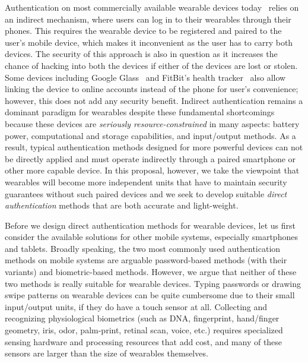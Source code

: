 Authentication on most commercially available wearable devices today~\cite{fitbit, smartwatch} relies on an indirect mechanism, where users can log in to their wearables through their phones. This requires the wearable device to be registered and paired to the user's mobile device, which makes it inconvenient as the user has to carry both devices. The security of this approach is also in question as it increases the chance of hacking into both the devices if either of the devices are lost or stolen. Some devices including Google Glass~\cite{googleglass} and FitBit's health tracker~\cite{fitbit} also allow linking the device to online accounts instead of the phone for user's convenience; however, this does not add any security benefit. Indirect authentication remains a dominant paradigm for wearables despite these fundamental shortcomings because these devices are \emph{seriously resource-constrained} in many aspects: battery power, computational and storage capabilities, and input/output methods. As a result, typical authentication methods designed for more powerful devices can not be directly applied and must operate indirectly through a paired smartphone or other more capable device. In this proposal, however, we take the viewpoint that wearables will become more independent units that have to maintain security guarantees without such paired devices and we seek to develop suitable \emph{direct authentication} methods that are both accurate and light-weight.

Before we design direct authentication methods for wearable devices, let us first consider the available solutions for other mobile systems, especially smartphones and tablets. Broadly speaking, the two most commonly used authentication methods on mobile systems are arguable password-based methods (with their variants) and biometric-based methods. However, we argue that neither of these two methods is really suitable for wearable devices. Typing passwords or drawing swipe patterns on wearable devices can be quite cumbersome due to their small input/output units, if they do have a touch sensor at all. Collecting and recognizing physiological biometrics (such as DNA, fingerprint, hand/finger geometry, iris, odor, palm-print, retinal scan, voice, etc.) requires specialized sensing hardware and processing resources that add cost, and many of these sensors are larger than the size of wearables themselves.

